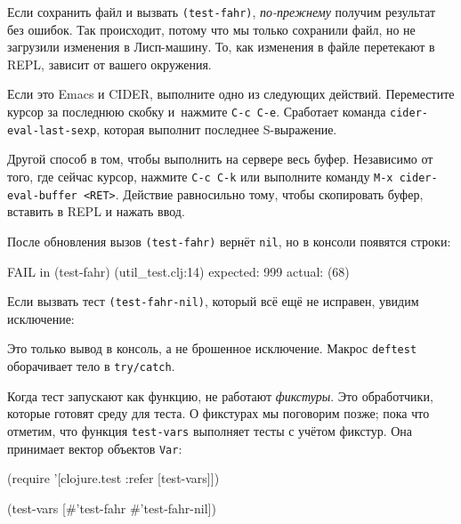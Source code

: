 Если сохранить файл и вызвать \verb|(test-fahr)|, \emph{по-прежнему} получим
результат без ошибок. Так происходит, потому что мы только сохранили файл, но не
загрузили изменения в Лисп-машину. То, как изменения в файле перетекают в REPL,
зависит от вашего окружения.


Если это Emacs и CIDER, выполните одно из следующих действий. Переместите курсор
за последнюю скобку  и~нажмите
\verb|C-c C-e|. Сработает команда \verb|cider-eval-last-sexp|, которая выполнит
последнее S-выражение.

Другой способ в том, чтобы выполнить на сервере весь буфер. Независимо от того,
где сейчас курсор, нажмите \verb|C-c C-k| или выполните команду
\verb|M-x cider-eval-buffer <RET>|. Действие равносильно тому, чтобы скопировать
буфер, вставить в REPL и нажать ввод.

После обновления вызов \verb|(test-fahr)| вернёт \verb|nil|, но в консоли
появятся строки:

\begin{english}
  \begin{clojure}
FAIL in (test-fahr) (util_test.clj:14)
expected: 999
  actual: (68)
  \end{clojure}
\end{english}

Если вызвать тест \verb|(test-fahr-nil)|, который всё ещё не исправен,
увидим исключение:

\begin{english}
\end{english}

Это только вывод в консоль, а не брошенное исключение. Макрос \verb|deftest|
оборачивает тело в \verb|try/catch|.

Когда тест запускают как функцию, не работают \emph{фикстуры}. Это обработчики,
которые готовят среду для теста. О фикстурах мы поговорим позже; пока что
отметим, что функция \verb|test-vars| выполняет тесты с учётом фикстур. Она
принимает вектор объектов \verb|Var|:

\begin{english}
  \begin{clojure}
(require '[clojure.test :refer [test-vars]])

(test-vars [#'test-fahr #'test-fahr-nil])
  \end{clojure}
\end{english}

